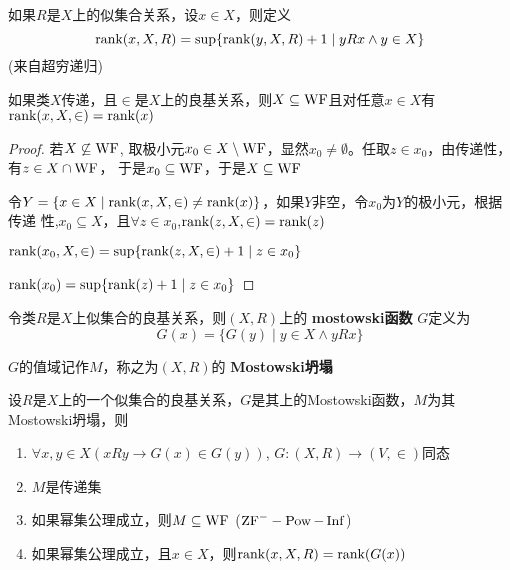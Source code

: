 \documentclass[11pt]{article}
\begin{document}
\begin{definition}[]
如果\(R\)是\(X\)上的似集合关系，设\(x\in X\)，则定义
\begin{equation*}
\text{rank}(x,X,R)=\sup\{\text{rank}(y,X,R)+1\mid yRx\wedge y\in X\}
\end{equation*}
(来自超穷递归)
\end{definition}

\begin{definition}[\(\ZFm\)]
如果类\(X\)传递，且\(\in\)是\(X\)上的良基关系，则\(X\subseteq\operatorname{WF}\)且对任意\(x\in X\)有\(\text{rank}(x,X,\in)=\text{rank}(x)\)
\end{definition}

\begin{proof}
若\(X\not\subseteq\operatorname{WF}\), 取极小元\(x_0\in X\setminus\operatorname{WF}\)，显然\(x_0\neq\emptyset\)。任取\(z\in x_0\)，由传递性，有\(z\in X\cap\operatorname{WF}\)，
于是\(x_0\subseteq\operatorname{WF}\)，于是\(X\subseteq\operatorname{WF}\)

令\(Y=\{x\in X\mid\text{rank}(x,X,\in)\neq\text{rank}(x)\}\)，如果\(Y\)非空，令\(x_0\)为\(Y\)的极小元，根据传递
性,\(x_0\subseteq X\)，且\(\forall z\in x_0\),\(\text{rank}(z,X,\in)=\text{rank}(z)\)

\(\text{rank}(x_0,X,\in)=\sup\{\text{rank}(z,X,\in)+1\mid z\in x_0\}\)

\(\text{rank}(x_0)=\sup\{\text{rank}(z)+1\mid z\in x_0\}\)
\end{proof}

\begin{definition}[]
令类\(R\)是\(X\)上似集合的良基关系，则\((X,R)\)上的 \textbf{mostowski函数} \(G\)定义为
\begin{equation*}
G(x)=\{G(y)\mid y\in X\wedge yRx\}
\end{equation*}

\(G\)的值域记作\(M\)，称之为\((X,R)\)的 \textbf{Mostowski坍塌}
\end{definition}

\begin{lemma}[]
设\(R\)是\(X\)上的一个似集合的良基关系，\(G\)是其上的Mostowski函数，\(M\)为其Mostowski坍塌，则
\begin{enumerate}
\item \(\forall x,y\in X(xRy\to G(x)\in G(y))\), \(G:(X,R)\to(V,\in)\)同态
\item \(M\)是传递集
\item 如果幂集公理成立，则\(M\subseteq\operatorname{WF}\) (\(\text{ZF}^--\operatorname{Pow}-\operatorname{Inf}\))
\item 如果幂集公理成立，且\(x\in X\)，则\(\text{rank}(x,X,R)=\text{rank}(G(x))\)
\end{enumerate}
\end{lemma}
\end{document}

